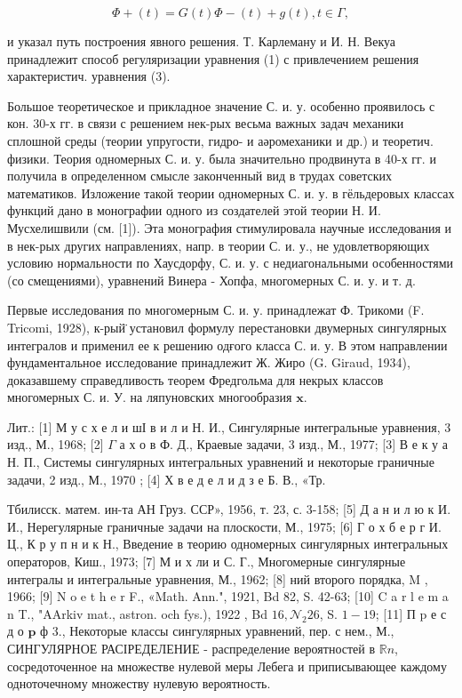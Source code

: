 \documentclass[10pt]{article}
\begin{document}
\[

\Phi+(t)=G(t) \Phi-(t)+g(t), t \in \Gamma,

\]



и указал путь построения явного решения. Т. Карлеману и И. Н. Векуа принадлежит способ регуляризации уравнения (1) с привлечением решения характеристич. уравнения (3).



Большое теоретическое и прикладное значение С. и. у. особенно проявилось с кон. 30-х гг. в связи с решением нек-рых весьма важных задач механики сплошной среды (теории упругости, гидро- и аәромеханики и др.) и теоретич. физики. Теория одномерных С. и. у. была значительно продвинута в 40-х гг. и получила в определенном смысле законченный вид в трудах советских математиков. Изложение такой теории одномерных С. и. у. в гёльдеровых классах функций дано в монографии одного из создателей этой теории Н. И. Мусхелишвили (см. [1]). Эта монография стимулировала научные исследования и в нек-рых других направлениях, напр. в теории С. и. у., не удовлетворяющих условию нормальности по Хаусдорфу, С. и. у. с недиагональными особенностями (со смещениями), уравнений Винера - Хопфа, многомерных С. и. у. и т. д.



Первые исследования по многомерным С. и. у. принадлежат Ф. Трикоми (F. Tricomi, 1928), к-рый̈ установил формулу перестановки двумерных сингулярных интегралов и применил ее к решению одғого класса С. и. у. В этом направлении фундаментальное исследование принадлежит Ж. Жиро (G. Giraud, 1934), доказавшему справедливость теорем Фредгольма для некрых классов многомерных С. и. У. на ляпуновских многообразия $\mathbf{x}$.



Лит.: [1] М у с х е л и шІ в и л и Н. И., Сингулярные интегральные уравнения, 3 изд., М., 1968; [2] $\Gamma$ а х о в Ф. Д., Краевые задачи, 3 изд., М., 1977; [3] В е к у а Н. П., Системы сингулярных интегральных уравнений и некоторые граничные задачи, 2 изд., М., 1970 ; [4] Х в е д е л и д з е Б. В., «Тр.

Тбилисск. матем. ин-та АН Груз. ССР», 1956, т. 23, с. 3-158; [5] Д а н и л ю к И. И., Нерегулярные граничные задачи на плоскости, М., 1975; [6] Г о х б е р г И. Ц., К р у п н и к Н., Введение в теорию одномерных сингулярных интегральных операторов, Киш., 1973; [7] М и х ли и С. Г., Многомерные сингулярные интегралы и интегральные уравнения, М., 1962; [8] ний второго порядка, M , 1966; [9] N o e t h e r F., «Math. Ann.", 1921, Bd 82, S. 42-63; [10] C a r l e m a n T., "AArkiv mat., astron. och fys.), 1922 , Bd $16, \mathcal{N}_{2} 26$, S. $1-19$; [11] П $\mathrm{p}$ е с д о $\mathbf{p}$ ф 3., Некоторые классы сингулярных уравнений, пер. с нем., М., СИНГУЛЯРНОЕ РАСІРЕДЕЛЕНИЕ - распределение вероятностей в $\mathbb{R} n$, сосредоточенное на множестве нулевой меры Лебега и приписывающее каждому одноточечному множеству нулевую вероятность.
\end{document}
